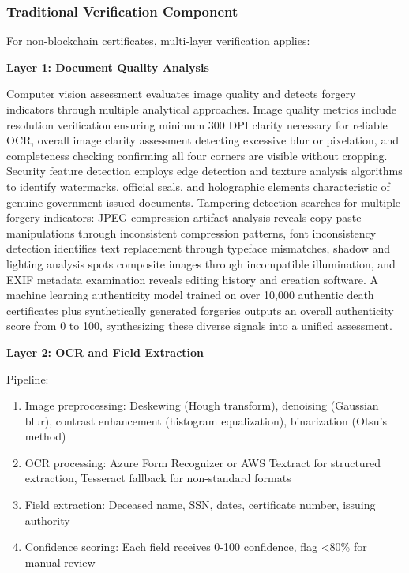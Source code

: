 \subsubsection{Traditional Verification Component}

For non-blockchain certificates, multi-layer verification applies:

\textbf{Layer 1: Document Quality Analysis}

Computer vision assessment evaluates image quality and detects forgery indicators through multiple analytical approaches. Image quality metrics include resolution verification ensuring minimum 300 DPI clarity necessary for reliable OCR, overall image clarity assessment detecting excessive blur or pixelation, and completeness checking confirming all four corners are visible without cropping. Security feature detection employs edge detection and texture analysis algorithms to identify watermarks, official seals, and holographic elements characteristic of genuine government-issued documents. Tampering detection searches for multiple forgery indicators: JPEG compression artifact analysis reveals copy-paste manipulations through inconsistent compression patterns, font inconsistency detection identifies text replacement through typeface mismatches, shadow and lighting analysis spots composite images through incompatible illumination, and EXIF metadata examination reveals editing history and creation software. A machine learning authenticity model trained on over 10,000 authentic death certificates plus synthetically generated forgeries outputs an overall authenticity score from 0 to 100, synthesizing these diverse signals into a unified assessment.

\textbf{Layer 2: OCR and Field Extraction}

Pipeline:
\begin{enumerate}
\item Image preprocessing: Deskewing (Hough transform), denoising (Gaussian blur), contrast enhancement (histogram equalization), binarization (Otsu's method)
\item OCR processing: Azure Form Recognizer or AWS Textract for structured extraction, Tesseract fallback for non-standard formats
\item Field extraction: Deceased name, SSN, dates, certificate number, issuing authority
\item Confidence scoring: Each field receives 0-100 confidence, flag <80\% for manual review
\end{enumerate}

